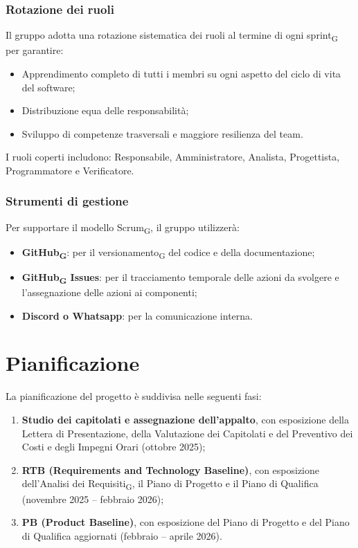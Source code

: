 \documentclass[11pt,a4paper]{article}
\newcommand{\gls}[1]{#1\textsubscript{G}}
\begin{document}
\subsubsection{Rotazione dei ruoli}
Il gruppo adotta una rotazione sistematica dei ruoli al termine di ogni \gls{sprint} per garantire:
\begin{itemize}
    \item Apprendimento completo di tutti i membri su ogni aspetto del ciclo di vita del software;
    \item Distribuzione equa delle responsabilità;
    \item Sviluppo di competenze trasversali e maggiore resilienza del team.
\end{itemize}
I ruoli coperti includono: Responsabile, Amministratore, Analista, Progettista, Programmatore e Verificatore.

\subsubsection{Strumenti di gestione}
Per supportare il modello \gls{Scrum}, il gruppo utilizzerà:
\begin{itemize}
    \item \textbf{\gls{GitHub}}: per il \gls{versionamento} del codice e della documentazione;
    \item \textbf{\gls{GitHub} Issues}: per il tracciamento temporale delle azioni da svolgere e l'assegnazione delle azioni ai componenti;
    \item \textbf{Discord o Whatsapp}: per la comunicazione interna.
\end{itemize}

\newpage

\section{Pianificazione}
La pianificazione del progetto è suddivisa nelle seguenti fasi:
\begin{enumerate}
    \item \textbf{Studio dei capitolati e assegnazione dell’appalto}, con esposizione della Lettera di Presentazione, della Valutazione dei Capitolati e del Preventivo dei Costi e degli Impegni Orari (ottobre 2025);
    \item \textbf{RTB (Requirements and Technology Baseline)}, con esposizione dell'\gls{Analisi dei Requisiti}, il Piano di Progetto e il Piano di Qualifica (novembre 2025 – febbraio 2026);
    \item \textbf{PB (Product Baseline)}, con esposizione del Piano di Progetto e del Piano di Qualifica aggiornati (febbraio – aprile 2026).
\end{enumerate}
\end{document}
